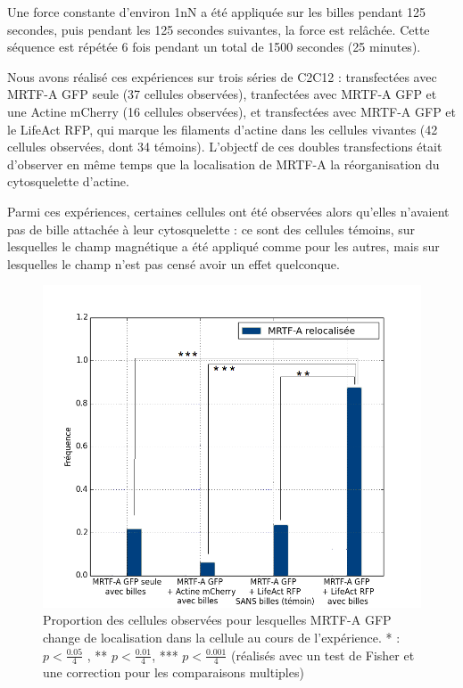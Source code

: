 Une force constante d'environ 1nN a été appliquée sur les billes pendant 125 secondes, puis pendant les 125 secondes suivantes, la force est relâchée. Cette séquence est répétée 6 fois pendant un total de 1500 secondes (25 minutes). 

Nous avons réalisé ces expériences sur trois séries de C2C12 : transfectées avec MRTF-A GFP seule (37 cellules observées), tranfectées avec MRTF-A GFP et une Actine mCherry (16 cellules observées), et transfectées avec MRTF-A GFP et le LifeAct RFP, qui marque les filaments d'actine dans les cellules vivantes (42 cellules observées, dont 34 témoins). 
L'objectf de ces doubles transfections était d'observer en même temps que la localisation de MRTF-A la réorganisation du cytosquelette d'actine. 

Parmi ces expériences, certaines cellules ont été observées alors qu'elles n'avaient pas de bille attachée à leur cytosquelette : ce sont des cellules témoins, sur lesquelles le champ magnétique a été appliqué comme pour les autres, mais sur lesquelles le champ n'est pas censé avoir un effet quelconque. 

\begin{figure}
\includegraphics[scale=0.4]{Figures/Pinces_MRTFA_stars_colors.png} 
\caption{Proportion des cellules observées pour lesquelles MRTF-A GFP change de localisation dans la cellule au cours de l'expérience. * : $p<\frac{0.05}{4}$ , ** $p<\frac{0.01}{4}$, *** $p<\frac{0.001}{4}$ (réalisés avec un test de Fisher et une correction pour les comparaisons multiples)\label{MRTF-A Pinces}}
\end{figure}

